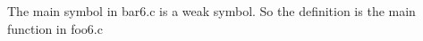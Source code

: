 \documentclass{article}
\begin{document}
The main symbol in bar6.c is a weak symbol. So the definition is the main function
in foo6.c
\end{document}
